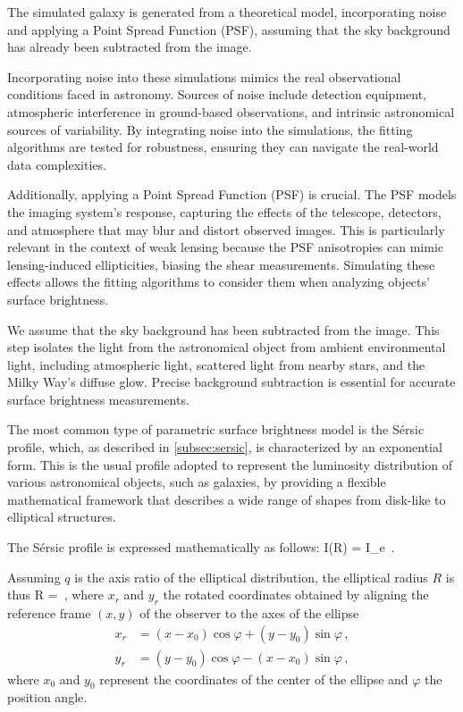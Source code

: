 The simulated galaxy is generated from a theoretical model, incorporating noise and applying a Point Spread Function (PSF), assuming that the sky background has already been subtracted from the image.

Incorporating noise into these simulations mimics the real observational conditions faced in astronomy. Sources of noise include detection equipment, atmospheric interference in ground-based observations, and intrinsic astronomical sources of variability. By integrating noise into the simulations, the fitting algorithms are tested for robustness, ensuring they can navigate the real-world data complexities.

Additionally, applying a Point Spread Function (PSF) is crucial. The PSF models the imaging system's response, capturing the effects of the telescope, detectors, and atmosphere that may blur and distort observed images. This is particularly relevant in the context of weak lensing because the PSF anisotropies can mimic lensing-induced ellipticities, biasing the shear measurements. Simulating these effects allows the fitting algorithms to consider them when analyzing objects' surface brightness.

We assume that the sky background has been subtracted from the image. This step isolates the light from the astronomical object from ambient environmental light, including atmospheric light, scattered light from nearby stars, and the Milky Way's diffuse glow. Precise background subtraction is essential for accurate surface brightness measurements.

The most common type of parametric surface brightness model is the Sérsic profile, which, as described in \cref{subsec:sersic}, is characterized by an exponential form. This is the usual profile adopted to represent the luminosity distribution of various astronomical objects, such as galaxies, by providing a flexible mathematical framework that describes a wide range of shapes from disk-like to elliptical structures.

The Sérsic profile is expressed mathematically as follows:
\be
\label{eq:5.1}
I(R) = I_e \exp {} \,.
\ee

Assuming $q$ is the axis ratio of the elliptical distribution, the elliptical radius $R$ is thus
\be
\label{eq:5.2}
R =  \,,
\ee
where $x_r$ and $y_r$ the rotated coordinates obtained by aligning the reference frame $(x,y)$ of the observer to the axes of the ellipse
\begin{equation}
\begin{aligned}
    \label{eq:5.3}
    x_r & = (x - x_0) \cos{\varphi} + (y - y_0) \sin{\varphi} \,,
    \\
    y_r & = (y - y_0) \cos{\varphi} - (x-x_0) \sin{\varphi}  \,,
\end{aligned}
\end{equation}
where $x_0$ and $y_0$ represent the coordinates of the center of the ellipse and $\varphi$ the position angle.

